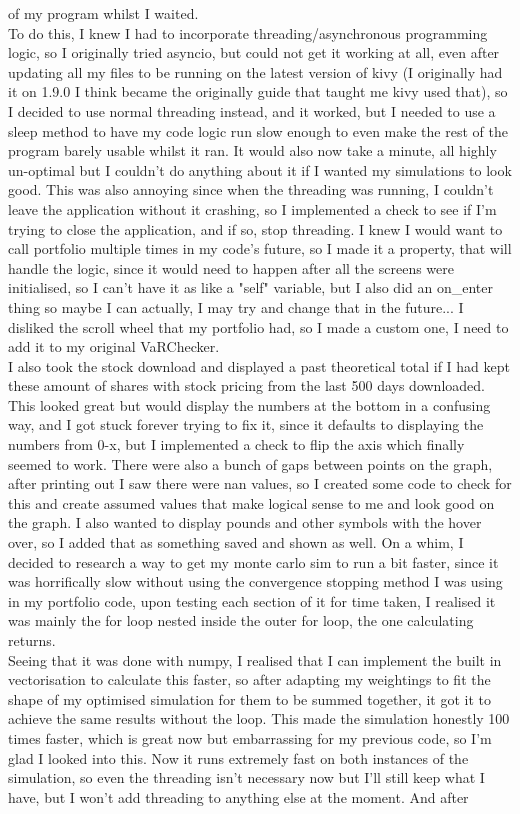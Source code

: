 \documentclass{article}
\begin{document}
of my program whilst I waited. \\To do this, I knew I had to incorporate threading/asynchronous programming\\ logic, so I originally tried asyncio, but could not get it working at all, even after updating all my files to be running on the latest version of kivy (I originally had it on 1.9.0 I think became the originally guide that taught me kivy used that), so I decided to use normal threading instead, and it worked, but I needed to use a sleep method to have my code logic run slow enough to even make the rest of the program barely usable whilst it ran. It would also now take a minute, all highly un-optimal but I couldn't do anything about it if I wanted my simulations to look good. This was also annoying since when the threading was running, I couldn't leave the application without it crashing, so I implemented a check to see if I'm trying to close the application, and if so, stop threading. I knew I would want to call portfolio multiple times in my code's future, so I made it a property, that will handle the logic, since it would need to happen after all the screens were initialised, so I can't have it as like a "self" variable, but I also did an on\_enter thing so maybe I can actually, I may try and change that in the future... I disliked the scroll wheel that my portfolio had, so I made a custom one, I need to add it to my original VaRChecker. \\I also took the stock download and displayed a past theoretical total if I had kept these amount of shares with stock pricing from the last 500 days downloaded. This looked great but would display the numbers at the bottom in a confusing way, and I got stuck forever trying to fix it, since it defaults to displaying the numbers from 0-x, but I implemented a check to flip the axis which finally seemed to work. There were also a bunch of gaps between points on the graph, after printing out I saw there were nan values, so I created some code to check for this and create assumed values that make logical sense to me and look good on the graph. I also wanted to display pounds and other symbols with the hover over, so I added that as something saved and shown as well. On a whim, I decided to research a way to get my monte carlo sim to run a bit faster, since it was horrifically slow without using the convergence stopping method I was using in my portfolio code, upon testing each section of it for time taken, I realised it was mainly the for loop nested inside the outer for loop, the one calculating returns. \\Seeing that it was done with numpy, I realised that I can implement the built in vectorisation to calculate this faster, so after adapting my weightings to fit the shape of my optimised simulation for them to be summed together, it got it to achieve the same results without the loop. This made the simulation honestly 100 times faster, which is great now but embarrassing for my previous code, so I'm glad I looked into this. Now it runs extremely fast on both instances of the simulation, so even the threading isn't necessary now but I'll still keep what I have, but I won't add threading to anything else at the moment. And after 
\end{document}
